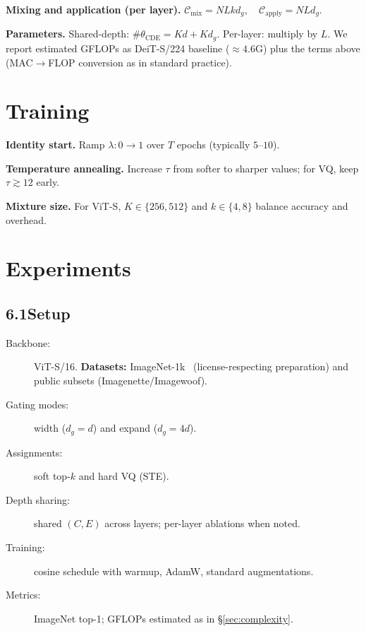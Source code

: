 \documentclass[11pt]{article}
\begin{document}
\textbf{Mixing and application (per layer).}
\(
\mathcal{C}_{\mathrm{mix}}=NLkd_g,\quad
\mathcal{C}_{\mathrm{apply}}=NLd_g.
\)

\textbf{Parameters.}
Shared-depth: $\#\theta_{\mathrm{CDE}}=Kd+Kd_g$. Per-layer: multiply by $L$. We report estimated GFLOPs as DeiT-S/224 baseline ($\approx 4.6$G) plus the terms above (MAC$\rightarrow$FLOP conversion as in standard practice).

\section{Training}
\textbf{Identity start.} Ramp $\lambda:0\!\rightarrow\!1$ over $T$ epochs (typically $5$--$10$).

\textbf{Temperature annealing.} Increase $\tau$ from softer to sharper values; for VQ, keep $\tau\gtrsim 12$ early.

\textbf{Mixture size.} For ViT-S, $K\in\{256,512\}$ and $k\in\{4,8\}$ balance accuracy and overhead.

\section{Experiments}
\subsection*{6.1\quad Setup}
\begin{description}
  \item[Backbone:] ViT-S/16.
  \textbf{Datasets:} ImageNet-1k~\citep{russakovsky2015imagenet} (license-respecting preparation) and public subsets (Imagenette/Imagewoof).
  \item[Gating modes:] width ($d_g{=}d$) and expand ($d_g{=}4d$).
  \item[Assignments:] soft top-$k$ and hard VQ (STE).
  \item[Depth sharing:] shared $(C,E)$ across layers; per-layer ablations when noted.
  \item[Training:] cosine schedule with warmup, AdamW, standard augmentations.
  \item[Metrics:] ImageNet top-1; GFLOPs estimated as in \S\ref{sec:complexity}.
\end{description}
\end{document}
